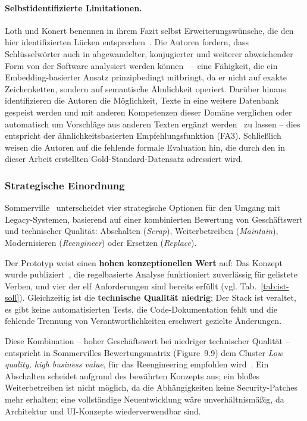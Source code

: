 \paragraph{Selbstidentifizierte Limitationen.}

Loth und Konert benennen in ihrem Fazit selbst Erweiterungswünsche, die den hier identifizierten Lücken entsprechen~\cite{loth2022kompetenzeditor,loth2022masterprojekt}.
Die Autoren fordern, dass \glqq Schlüsselwörter auch in abgewandelter, konjugierter und weiterer abweichender Form von der Software analysiert werden können\grqq~\cite{loth2022kompetenzeditor} -- eine Fähigkeit, die ein Embedding-basierter Ansatz prinzipbedingt mitbringt, da er nicht auf exakte Zeichenketten, sondern auf semantische Ähnlichkeit operiert.
Darüber hinaus identifizieren die Autoren die Möglichkeit, Texte \glqq in eine weitere Datenbank gespeist werden und mit anderen Kompetenzen dieser Domäne verglichen oder automatisch um Vorschläge aus anderen Texten ergänzt werden\grqq~\cite{loth2022kompetenzeditor} zu lassen -- dies entspricht der ähnlichkeitsbasierten Empfehlungsfunktion (FA3).
Schließlich weisen die Autoren auf die fehlende formale Evaluation hin, die durch den in dieser Arbeit erstellten Gold-Standard-Datensatz adressiert wird.

\subsubsection{Strategische Einordnung}\label{sec:strategische-einordnung}

Sommerville~\cite{sommerville2016software} unterscheidet vier strategische Optionen für den Umgang mit Legacy-Systemen, basierend auf einer kombinierten Bewertung von Geschäftswert und technischer Qualität:
Abschalten (\emph{Scrap}), Weiterbetreiben (\emph{Maintain}), Modernisieren (\emph{Reengineer}) oder Ersetzen (\emph{Replace}).

Der Prototyp weist einen \textbf{hohen konzeptionellen Wert} auf: Das Konzept wurde publiziert~\cite{loth2022kompetenzeditor}, die regelbasierte Analyse funktioniert zuverlässig für gelistete Verben, und vier der elf Anforderungen sind bereits erfüllt (vgl. Tab.~\ref{tab:ist-soll}).
Gleichzeitig ist die \textbf{technische Qualität niedrig}: Der Stack ist veraltet, es gibt keine automatisierten Tests, die Code-Dokumentation fehlt und die fehlende Trennung von Verantwortlichkeiten erschwert gezielte Änderungen.

Diese Kombination -- hoher Geschäftswert bei niedriger technischer Qualität -- entspricht in Sommervilles Bewertungsmatrix (Figure~9.9) dem Cluster \emph{Low quality, high business value}, für das Reengineering empfohlen wird~\cite{sommerville2016software}.
Ein Abschalten scheidet aufgrund des bewährten Konzepts aus; ein bloßes Weiterbetreiben ist nicht möglich, da die Abhängigkeiten keine Security-Patches mehr erhalten; eine vollständige Neuentwicklung wäre unverhältnismäßig, da Architektur und UI-Konzepte wiederverwendbar sind.

